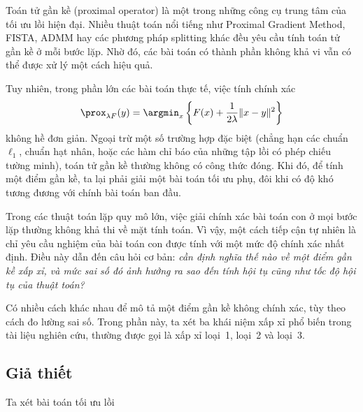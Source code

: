 %
%

Toán tử gần kề (proximal operator) là một trong những công cụ trung tâm của tối ưu lồi hiện đại. Nhiều thuật toán nổi tiếng như Proximal Gradient Method, FISTA, ADMM hay các phương pháp splitting khác đều yêu cầu tính toán tử gần kề ở mỗi bước lặp. Nhờ đó, các bài toán có thành phần không khả vi vẫn có thể được xử lý một cách hiệu quả.

Tuy nhiên, trong phần lớn các bài toán thực tế, việc tính chính xác
\[
\prox_{\lambda F}(y)
=
\argmin_x
\left\{
F(x)+\frac1{2\lambda}\|x-y\|^2
\right\}
\]
không hề đơn giản. Ngoại trừ một số trường hợp đặc biệt (chẳng hạn các chuẩn $\ell_1$, chuẩn hạt nhân, hoặc các hàm chỉ báo của những tập lồi có phép chiếu tường minh), toán tử gần kề thường không có công thức đóng. Khi đó, để tính một điểm gần kề, ta lại phải giải một bài toán tối ưu phụ, đôi khi có độ khó tương đương với chính bài toán ban đầu.

Trong các thuật toán lặp quy mô lớn, việc giải chính xác bài toán con ở mọi bước lặp thường không khả thi về mặt tính toán. Vì vậy, một cách tiếp cận tự nhiên là chỉ yêu cầu nghiệm của bài toán con được tính với một mức độ chính xác nhất định. Điều này dẫn đến câu hỏi cơ bản: \emph{cần định nghĩa thế nào về một điểm gần kề xấp xỉ, và mức sai số đó ảnh hưởng ra sao đến tính hội tụ cũng như tốc độ hội tụ của thuật toán?}

Có nhiều cách khác nhau để mô tả một điểm gần kề không chính xác, tùy theo cách đo lường sai số. Trong phần này, ta xét ba khái niệm xấp xỉ phổ biến trong tài liệu nghiên cứu, thường được gọi là xấp xỉ loại~1, loại~2 và loại~3. 
\subsection{Giả thiết}
Ta xét bài toán tối ưu lồi

